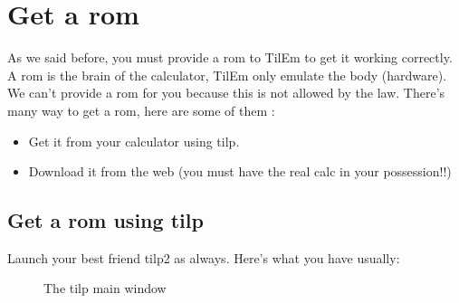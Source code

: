 \documentclass[10pt]{report}
\begin{document}
\chapter{Get a rom}

As we said before, you must provide a rom to TilEm to get it working correctly.\newline
A rom is the brain of the calculator, TilEm only emulate the body (hardware).\newline
We can't provide a rom for you because this is not allowed by the law.\newline
There's many way to get a rom, here are some of them : \newline
\begin{itemize}
\item Get it from your calculator using tilp.
\item Download it from the web (you must have the real calc in your possession!!)
\end{itemize}

\section{Get a rom using tilp}
Launch your best friend tilp2 as always.\newline\newline
Here's what you have usually:\newline
\begin{figure}[H]
\centering
{}
\caption{The tilp main window}
\end{figure}
\end{document}
